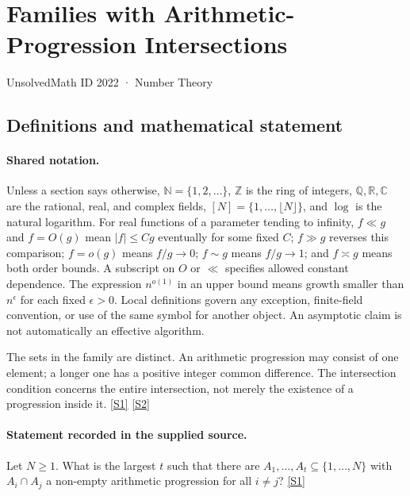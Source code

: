 \documentclass[11pt,a4paper]{article}
\newcommand{\N}{\mathbb{N}}
\newcommand{\Z}{\mathbb{Z}}
\newcommand{\Q}{\mathbb{Q}}
\newcommand{\R}{\mathbb{R}}
\newcommand{\C}{\mathbb{C}}
\newcommand{\sref}[2]{\hyperlink{source:#1:#2}{[S#2]}}
\begin{document}

\setcounter{section}{2021}

\section{Families with Arithmetic-Progression Intersections}\label{2022}

{\small\sffamily UnsolvedMath ID 2022 · Number Theory}

\subsection{Definitions and mathematical statement}

\paragraph{Shared notation.}Unless a section says otherwise, $\N=\{1,2,\ldots\}$,
$\Z$ is the ring of integers, $\Q,\R,\C$ are the rational, real, and complex
fields, $[N]=\{1,\ldots,\lfloor N\rfloor\}$, and $\log$ is the natural
logarithm. For real functions of a parameter tending to infinity,
$f\ll g$ and $f=O(g)$ mean $|f|\leq Cg$ eventually for some fixed $C$;
$f\gg g$ reverses this comparison; $f=o(g)$ means $f/g\to0$;
$f\sim g$ means $f/g\to1$; and $f\asymp g$ means both order bounds.
A subscript on $O$ or $\ll$ specifies allowed constant dependence.
The expression $n^{o(1)}$ in an upper bound means growth smaller than
$n^\epsilon$ for each fixed $\epsilon>0$. Local definitions govern any
exception, finite-field convention, or use of the same symbol for another
object. An asymptotic claim is not automatically an effective algorithm.



The sets in the family are distinct. An arithmetic progression may consist of one element; a longer one has a positive integer common difference. The intersection condition concerns the entire intersection, not merely the existence of a progression inside it. \sref{2022}{1} \sref{2022}{2}

\paragraph{Statement recorded in the supplied source.}
Let $N\geq 1$. What is the largest $t$ such that there are $A_1,\ldots,A_t\subseteq \{1,\ldots,N\}$ with $A_i\cap A_j$ a non-empty arithmetic progression for all $i\neq j$? \sref{2022}{1}
\end{document}
